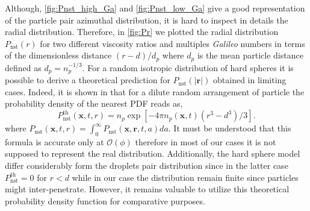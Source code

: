 Although, \ref{fig:Pnst_high_Ga} and \ref{fig:Pnst_low_Ga} give a good representation of the particle pair azimuthal distribution, it is hard to inspect in details the radial distribution.
Therefore, in \ref{fig:Pr}  we plotted the radial distribution $P_\text{nst}(r)$ for two different viscosity ratios and multiples \textit{Galileo} numbers in terms of the dimensionless distance $(r - d)/d_p$ where $d_p$ is the mean particle distance defined as $d_p = n_p^{-1/3}$.  
For a random isotropic distribution of hard spheres it is possible to derive a theoretical prediction for $P_\text{nst}(|\textbf{r}|)$ obtained in limiting cases. 
Indeed, it is shown in \citet{zhang2021ensemble} that for a dilute random arrangement of particle the probability density of the nearest PDF reads as, 
\begin{equation}
    P_\text{nst}^\text{th}(\textbf{x},t,r) = n_p \exp[{-4 \pi n_p(\textbf{x},t) (r^3 - d^3)/3}].
    \label{eq:Pnst_dilute}
\end{equation}
where $P_\text{nst}(\textbf{x},t,r) = \int_0^\infty P_\text{nst}(\textbf{x},\textbf{r},t,a) da$.
It must be understood that this formula is accurate only at $\mathcal{O}(\phi)$ therefore in most of our cases it is not supposed to represent the real distribution.
Additionally, the hard sphere model differ considerably form the droplets pair distribution since in the latter case $P_\text{nst}^\text{th} = 0$ for $r<d$ while in our case the distribution remain finite since particles might inter-penetrate. 
However, it remains valuable to utilize this theoretical probability density function for comparative purposes. 


